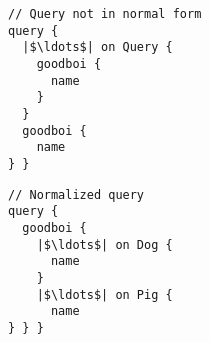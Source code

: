 \begin{minipage}[t]{.25\textwidth}
\begin{verbatim}
// Query not in normal form
query {
  |$\ldots$| on Query {
    goodboi {
      name
	}
  }
  goodboi {
    name
} }
\end{verbatim}
\end{minipage}%
\begin{minipage}[t]{.25\textwidth}
\begin{verbatim}
// Normalized query
query {
  goodboi {
    |$\ldots$| on Dog {
	  name
	}
	|$\ldots$| on Pig {
	  name
} } }
\end{verbatim} 
\end{minipage}


\iffalse
\begin{minipage}[t]{.25\textwidth}
\begin{verbatim}
// Redundant query
query {
    goodboi {
        name
    }
    goodboi { 
 	name
    } 
}
\end{verbatim}
\end{minipage}%
\begin{minipage}[t]{.25\textwidth}
\begin{verbatim}

// Normalized query
query {
    goodboi {
        |$\ldots$| on Dog {
	    name
	}
	|$\ldots$| on Pig {
	    name
	}
    }	
}
\end{verbatim} 
\end{minipage}
\fi


